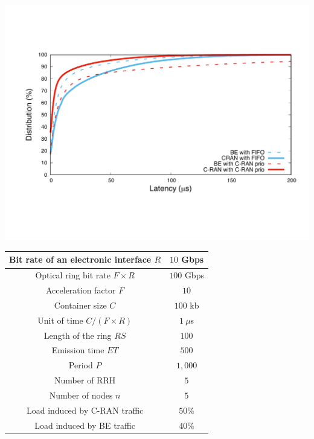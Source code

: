 \documentclass[]{algotel}
\begin{document}
    \begin{minipage}[b]{0.50\linewidth}


        \begin{center}
      \includegraphics[scale=0.3]{opport.pdf}

          \label{fig:resultopport}
      \end{center} 
  \end{minipage}
\hfill
  \begin{minipage}[b]{0.40\linewidth}
  \vspace{-2cm}
  \scalebox{0.7}
  {
  \centering
  \begin{tabular}{|c|c|}
  \hline
  Bit rate of an electronic interface $R$ & $10$ Gbps \tabularnewline
  \hline
  Optical ring bit rate $F\times R$ & $100$ Gbps \tabularnewline
  \hline
    Acceleration factor $F$ & $10$  \tabularnewline
  \hline
  Container size  $C$ & $100$ kb  \tabularnewline
  \hline
  Unit of time $C/(F\times R)$ & $1~\mu$s \tabularnewline
  \hline
  Length of the ring $RS$ & $100$ \tabularnewline
  \hline
  Emission time $ET$ & $500$ \tabularnewline
  \hline
   Period $P$ & $1,000$ \tabularnewline
  \hline
  Number of RRH & $5$  \tabularnewline
  \hline
  Number of nodes $n$ & $5$  \tabularnewline
  \hline
   Load induced by C-RAN traffic & $50\%$  \tabularnewline
  \hline
    Load induced by BE traffic & $40\%$  \tabularnewline
  \hline
  \end{tabular}
  }
  \vspace{0.3cm}
  \label{fig:params}

  \end{minipage} 
  
\end{document}
